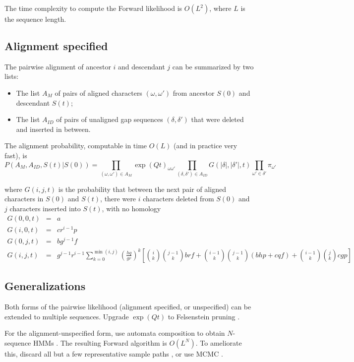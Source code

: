 \documentclass{article}
\begin{document}
The time complexity to compute the Forward likelihood is $O(L^2)$,
where $L$ is the sequence length.

\subsection{Alignment specified}

The pairwise alignment of ancestor $i$ and descendant $j$ can be summarized by two lists:
\begin{itemize}
    \item The list $A_M$ of pairs of aligned characters $(\omega,\omega')$ from ancestor $S(0)$ and descendant $S(t)$;
    \item The list $A_{ID}$ of pairs of unaligned gap sequences $(\delta,\delta')$ that were deleted and inserted in between.
\end{itemize}

The alignment probability, computable in time $O(L)$ (and in practice very fast), is
\[
P(A_M,A_{ID},S(t)|S(0)) =
\prod_{(\omega,\omega') \in A_M} \exp(Qt)_{\omega \omega'}
\prod_{(\delta,\delta') \in A_{ID}} G(|\delta|,|\delta'|,t)
\prod_{\omega'\in \delta'} \pi_{\omega'}
\]

where $G(i,j,t)$ is the probability that between the next pair of aligned characters in $S(0)$ and $S(t)$,
there were $i$ characters deleted from $S(0)$ 
and $j$ characters inserted into $S(t)$,
with no homology
\begin{eqnarray*}
G(0,0,t) & = & a \\
G(i,0,t) & = & cr^{i-1}p \\
G(0,j,t) & = & bg^{j-1}f \\
G(i,j,t) & = &
g^{j-1} r^{i-1}
\sum_{k=0}^{\min(i,j)}
\left(\frac{hq}{gr}\right)^k
\left[
\binom{i}{k} \binom{j-1}{k} brf
+ \binom{i-1}{k} \binom{j-1}{k} (bhp+cqf)
+ \binom{i-1}{k} \binom{j}{k} cgp
\right]
\end{eqnarray*}

\subsection{Generalizations}

Both forms of the pairwise likelihood (alignment specified, or unspecified) can be extended to multiple sequences.
Upgrade $\exp(Qt)$ to Felsenstein pruning \cite{Felsenstein81}.

For the alignment-unspecified form, use automata composition to obtain $N$-sequence HMMs \cite{SilvestreRyanEtAl2020}.
The resulting Forward algorithm is $O(L^N)$.
To ameliorate this, discard all but a few representative sample paths \cite{WestessonEtAl2012},
or use MCMC \cite{RedelingsSuchard2007}.
\end{document}
